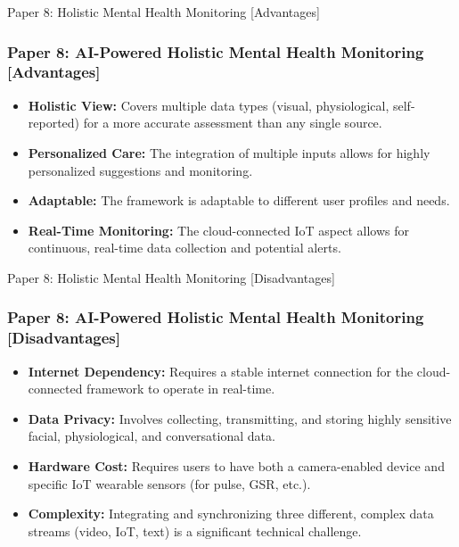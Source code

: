 \documentclass[11pt]{beamer}
\begin{document}
\begin{frame}{Paper 8: Holistic Mental Health Monitoring [Advantages]}
\frametitle{Paper 8: AI-Powered Holistic Mental Health Monitoring [Advantages]}
\begin{itemize}
    \item \textbf{Holistic View:} Covers multiple data types (visual, physiological, self-reported) for a more accurate assessment than any single source.
    \item \textbf{Personalized Care:} The integration of multiple inputs allows for highly personalized suggestions and monitoring.
    \item \textbf{Adaptable:} The framework is adaptable to different user profiles and needs.
    \item \textbf{Real-Time Monitoring:} The cloud-connected IoT aspect allows for continuous, real-time data collection and potential alerts.
\end{itemize}
\end{frame}

\begin{frame}{Paper 8: Holistic Mental Health Monitoring [Disadvantages]}
\frametitle{Paper 8: AI-Powered Holistic Mental Health Monitoring [Disadvantages]}
\begin{itemize}
    \item \textbf{Internet Dependency:} Requires a stable internet connection for the cloud-connected framework to operate in real-time.
    \item \textbf{Data Privacy:} Involves collecting, transmitting, and storing highly sensitive facial, physiological, and conversational data.
    \item \textbf{Hardware Cost:} Requires users to have both a camera-enabled device and specific IoT wearable sensors (for pulse, GSR, etc.).
    \item \textbf{Complexity:} Integrating and synchronizing three different, complex data streams (video, IoT, text) is a significant technical challenge.
\end{itemize}
\end{frame}

\end{document}
